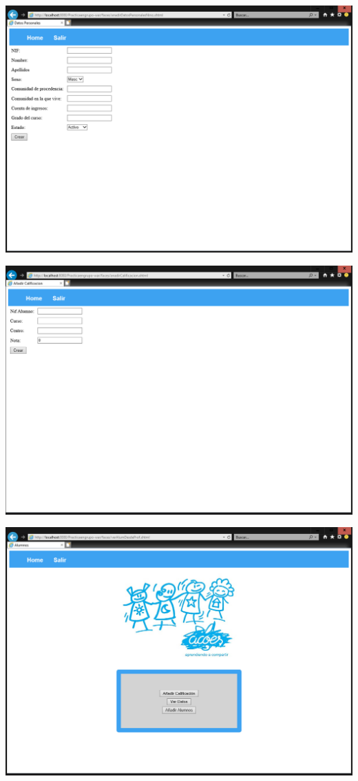 \documentclass{article}
\begin{document}
\begin{center}
\includegraphics[scale=0.5]{capturas/ANADIRALUMNOS.PNG}
\end{center}

\begin{center}
\includegraphics[scale=0.5]{capturas/ANADIRCALIFICACIONALUMNOS.PNG}
\end{center}

\begin{center}
\includegraphics[scale=0.5]{capturas/COSASDELOSALUMNOS.PNG}
\end{center}
\end{document}
